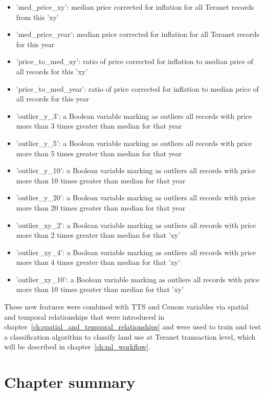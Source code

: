 \begin{itemize}
    \item 'med\_price\_xy': median price corrected for inflation for all Teranet records from this 'xy'
    \item 'med\_price\_year': median price corrected for inflation for all Teranet records for this year
    \item 'price\_to\_med\_xy': ratio of price corrected for inflation to median price of all records for this 'xy'
    \item 'price\_to\_med\_year': ratio of price corrected for inflation to median price of all records for this year
    \item 'outlier\_y\_3': a Boolean variable marking as outliers all records with price more than 3 times greater than median for that year
    \item 'outlier\_y\_5': a Boolean variable marking as outliers all records with price more than 5 times greater than median for that year
    \item 'outlier\_y\_10': a Boolean variable marking as outliers all records with price more than 10 times greater than median for that year
    \item 'outlier\_y\_20': a Boolean variable marking as outliers all records with price more than 20 times greater than median for that year
    \item 'outlier\_xy\_2': a Boolean variable marking as outliers all records with price more than 2 times greater than median for that 'xy'
    \item 'outlier\_xy\_4': a Boolean variable marking as outliers all records with price more than 4 times greater than median for that 'xy'
    \item 'outlier\_xy\_10': a Boolean variable marking as outliers all records with price more than 10 times greater than median for that 'xy'
\end{itemize}

These new features were combined with TTS and Census variables via spatial and temporal relationships that were introduced in chapter~\ref{ch:spatial_and_temporal_relationships} and were used to train and test a classification algorithm to classify land use at Teranet transaction level, which will be described in chapter~\ref{ch:ml_workflow}.

\section{Chapter summary} \label{sec:data_preparation_summary}

